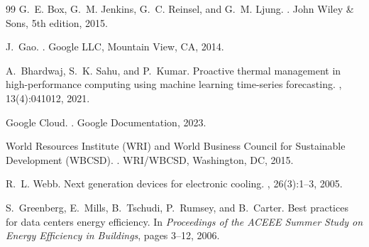 \begin{thebibliography}{99}
G.~E. Box, G.~M. Jenkins, G.~C. Reinsel, and G.~M. Ljung.
.
\newblock John Wiley \& Sons, 5th edition, 2015.

J.~Gao.
.
\newblock Google LLC, Mountain View, CA, 2014.

A.~Bhardwaj, S.~K. Sahu, and P.~Kumar.
\newblock Proactive thermal management in high-performance computing using machine learning time-series forecasting.
, 13(4):041012, 2021.

Google Cloud.
.
\newblock Google Documentation, 2023.

World Resources Institute (WRI) and World Business Council for Sustainable Development (WBCSD).
.
\newblock WRI/WBCSD, Washington, DC, 2015.

R.~L. Webb.
\newblock Next generation devices for electronic cooling.
, 26(3):1--3, 2005.

S.~Greenberg, E.~Mills, B.~Tschudi, P.~Rumsey, and B.~Carter.
\newblock Best practices for data centers energy efficiency.
\newblock In {\em Proceedings of the ACEEE Summer Study on Energy Efficiency in Buildings}, pages 3--12, 2006.

\end{thebibliography}
